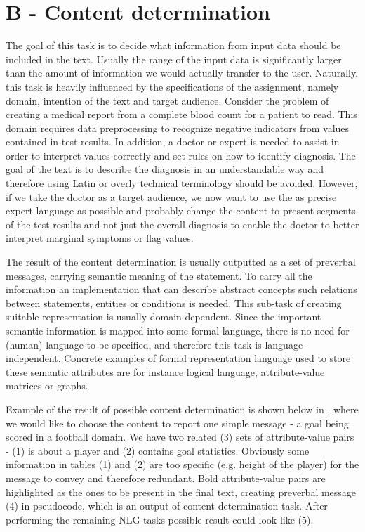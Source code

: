 \section{B - Content determination}
The goal of this task is to decide what information from input data should be included in the text. Usually the range of the input data is significantly larger than the amount of information we would actually transfer to the user. Naturally, this task is heavily influenced by the specifications of the assignment, namely domain, intention of the text and target audience. Consider the problem of creating a medical report from a complete blood count for a patient to read. This domain requires data preprocessing to recognize negative indicators from values contained in test results. In addition, a doctor or expert is needed to assist in order to interpret values correctly and set rules on how to identify diagnosis. The goal of the text is to describe the diagnosis in an understandable way and therefore using Latin or overly technical terminology should be avoided. However, if we take the doctor as a target audience, we now want to use the as precise expert language as possible and probably change the content to present segments of the test results and not just the overall diagnosis to enable the doctor to better interpret marginal symptoms or flag values.

The result of the content determination is usually outputted as a set of preverbal messages, carrying semantic meaning of the statement. To carry all the information an implementation that can describe abstract concepts such relations between statements, entities or conditions is needed. This sub-task of creating suitable representation is usually domain-dependent. Since the important semantic information is mapped into some formal language, there is no need for (human) language to be specified, and therefore this task is language-independent. Concrete examples of formal representation language used to store these semantic attributes are for instance logical language, attribute-value matrices or graphs.

Example of the result of possible content determination is shown below in , where we would like to choose the content to report one simple message - a goal being scored in a football domain. We have two related (3) sets of attribute-value pairs - (1) is about a player and (2) contains goal statistics. Obviously some information in tables (1) and (2) are too specific (e.g. height of the player) for the message to convey and therefore redundant. Bold attribute-value pairs are highlighted as the ones to be present in the final text, creating preverbal message (4) in pseudocode, which is an output of content determination task. After performing the remaining NLG tasks possible result could look like (5). 

